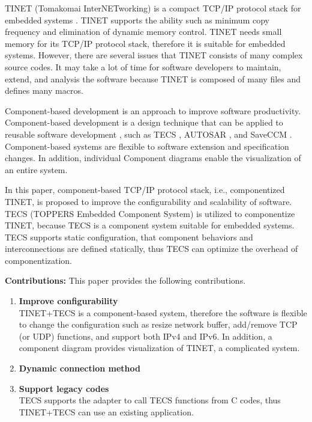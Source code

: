\documentclass[conference]{IEEEtran/IEEEtran}
\begin{document}
TINET (Tomakomai InterNETworking) is a compact TCP/IP protocol stack for embedded systems \cite{url:TINET}.
TINET supports the ability such as minimum copy frequency and elimination of dynamic memory control.
TINET needs small memory for its TCP/IP protocol stack, therefore it is suitable for embedded systems.
However, there are several issues that TINET consists of many complex source codes.
It may take a lot of time for software developers to maintain, extend, and analysis the software because TINET is composed of many files and defines many macros.

Component-based development is an approach to improve software productivity.
Component-based development is a design technique that can be applied to reusable software development \cite{par:CBD}, such as TECS \cite{par:TECS}, AUTOSAR \cite{url:AUTOSAR}, and SaveCCM \cite{par:SAVEapproach}.
Component-based systems are flexible to software extension and specification changes.
In addition, individual Component diagrams enable the visualization of an entire system.

In this paper, component-based TCP/IP protocol stack, i.e., componentized TINET, is proposed to improve the configurability and scalability of software.
TECS (TOPPERS Embedded Component System) \cite{par:TECS} is utilized to componentize TINET, because TECS is a component system suitable for embedded systems.
TECS supports static configuration, that component behaviors and interconnections are defined statically, thus TECS can optimize the overhead of componentization.


{\bf Contributions:} This paper provides the following contributions.

\begin{enumerate}

    \item {\bf Improve configurability}\mbox{}\\
        TINET+TECS is a component-based system, therefore the software is flexible to change the configuration such as resize network buffer, add/remove TCP (or UDP) functions, and support both IPv4 and IPv6.
        In addition, a component diagram provides visualization of TINET, a complicated system.

    \item {\bf Dynamic connection method}\mbox{}\\
        

    \item {\bf Support legacy codes}\mbox{}\\
        TECS supports the adapter to call TECS functions from C codes, thus TINET+TECS can use an existing application.

\end{enumerate}
\end{document}
